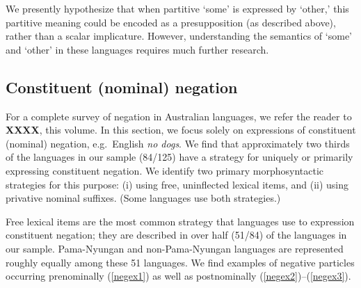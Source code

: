 \documentclass[12pt,egregdoesnotlikesansseriftitles]{scrartcl}
\makeatletter
\newcommand{\ofy}{/125} %
\makeatother
\begin{document}


We presently hypothesize that when partitive `some' is expressed by `other,' this partitive meaning could be encoded as a presupposition (as described above), rather than a scalar implicature.  However, understanding the semantics of `some' and `other' in these languages requires much further research.


\subsection{Constituent (nominal) negation
\label{sec:neg}}


For a complete survey of negation in Australian languages, we refer the reader to \textbf{XXXX}, this volume. In this section, we focus solely on expressions of constituent (nominal) negation, e.g.\ English \textit{no dogs}. We find that approximately two thirds of the languages in our sample (84\ofy) have a strategy for uniquely or primarily expressing constituent negation.  We identify two primary morphosyntactic  strategies for this purpose: (i) using free, uninflected lexical items, and (ii) using privative nominal suffixes. (Some languages use both strategies.)

 Free lexical items are the most common strategy that languages use to expression constituent negation; they are described in over half (51/84) of the languages in our sample. Pama-Nyungan and non-Pama-Nyungan languages are represented roughly equally among these 51 languages. We find examples of negative particles occurring prenominally (\ref{negex1}) as well as postnominally (\ref{negex2})--(\ref{negex3}). 
 
\end{document}
